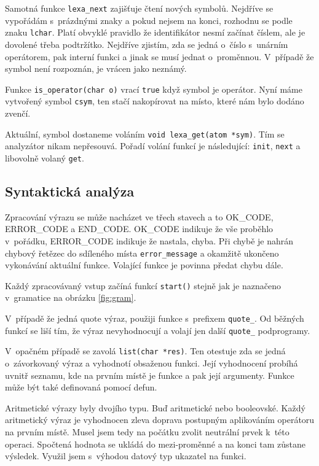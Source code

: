 \documentclass[a4paper, 12pt]{article}
\begin{document}
Samotná funkce \texttt{lexa\_next} zajišťuje čtení nových symbolů.
Nejdříve se vypořádám s~prázdnými znaky a pokud nejsem na konci,
rozhodnu se podle znaku \texttt{lchar}. Platí obvyklé pravidlo
že identifikátor nesmí začínat číslem, ale je dovolené třeba podtržítko.
Nejdříve zjistím, zda se jedná o~číslo s~unárním operátorem, pak
interní funkci a jinak se musí jednat o~proměnnou. V~případě
že symbol není rozpoznán, je vrácen jako neznámý.

Funkce \texttt{is\_operator(char o)} vrací \texttt{true} když
symbol je operátor. Nyní máme vytvořený symbol \texttt{csym}, ten
stačí nakopírovat na místo, které nám bylo dodáno zvenčí.

Aktuální, symbol dostaneme voláním
\verb+void lexa_get(atom *sym)+. Tím se analyzátor nikam nepřesouvá.
Pořadí volání funkcí je následující: \texttt{init}, \texttt{next} a
libovolně volaný \texttt{get}.

\subsection{Syntaktická analýza}
Zpracování výrazu se může nacházet ve třech stavech a to OK\_CODE,
ERROR\_CODE a END\_CODE. OK\_CODE indikuje že vše proběhlo v~pořádku,
ERROR\_CODE indikuje že nastala, chyba. Při chybě je nahrán chybový
řetězec do sdíleného místa \texttt{error\_message} a okamžitě ukončeno
vykonávání aktuální funkce. Volající funkce je povinna předat chybu dále.

Každý zpracovávaný vstup začíná funkcí \texttt{start()} stejně jak
je naznačeno v~gramatice na obrázku \ref{fig:gram}.

V~případě že jedná quote výraz, použiji funkce s~prefixem
\texttt{quote\_}. Od běžných funkcí se liší tím, že výraz nevyhodnocují
a volají jen další \texttt{quote\_} podprogramy.

V~opačném případě se zavolá \texttt{list(char *res)}. Ten otestuje
zda se jedná o~závorkovaný výraz a vyhodnotí obsaženou funkci.
Její vyhodnocení probíhá uvnitř seznamu, kde na prvním místě je
funkce a pak její argumenty. Funkce může být také definovaná pomocí
\textsf{defun}.

Aritmetické výrazy byly dvojího typu. Buď aritmetické nebo
booleovské. Každý aritmetický výraz je vyhodnocen zleva doprava
postupným aplikováním operátoru na prvním místě. Musel jsem tedy na
počátku zvolit neutrální prvek k~této operaci. Spočtená hodnota se
ukládá do mezi-proměnné a na konci tam zůstane výsledek. Využil jsem
s~výhodou datový typ ukazatel na funkci.
\end{document}
